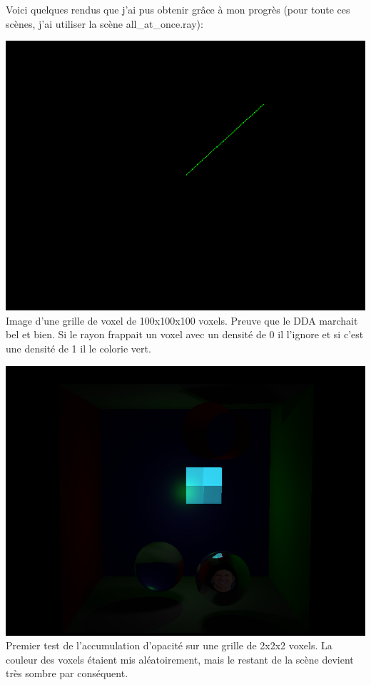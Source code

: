 \documentclass{article}
\begin{document}
Voici quelques rendus que j'ai pus obtenir grâce à mon progrès (pour toute ces scènes, j'ai utiliser
la scène all\_at\_once.ray):
\begin{center}
    \includegraphics[scale = 0.5]{Images/GrilleDiagonale.png} \\
    Image d'une grille de voxel de 100x100x100 voxels. Preuve que le DDA marchait bel et bien. Si le rayon frappait
    un voxel avec un densité de 0 il l'ignore et si c'est une densité de 1 il le colorie vert.
\end{center}
\begin{center}
    \includegraphics[scale = 0.5]{Images/PremierTest.png} \\
    Premier test de l'accumulation d'opacité sur une grille de 2x2x2 voxels. La couleur des voxels étaient
    mis aléatoirement, mais le restant de la scène devient très sombre par conséquent.
\end{center}
\end{document}
